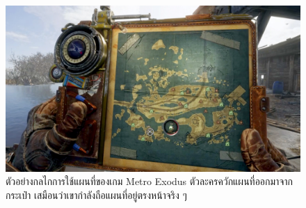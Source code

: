 \begin{figure}[h]
  \begin{center}
  \includegraphics[width=\textwidth]{./img/metromap.jpg}
  \end{center}
  \caption[ตัวอย่างกลไกการใช้แผนที่ของเกม Metro Exodus]{ตัวอย่างกลไกการใช้แผนที่ของเกม Metro Exodus ตัวละครควักแผนที่ออกมาจากกระเป๋า เสมือนว่าเขากำลังถือแผนที่อยู่ตรงหน้าจริง ๆ}
  \label{fig:metromap}
\end{figure}